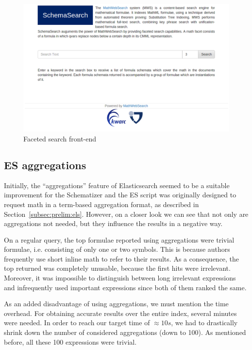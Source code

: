 \documentclass[a4paper,oneside]{article}
\begin{document}
\begin{figure}[ht]\centering
    \includegraphics[width=12.8cm]{img/frontend.png}
    \caption{Faceted search front-end}\label{fig:frontend}
\end{figure}
\FloatBarrier

\subsection{ES aggregations}\label{subsec:esagg}
Initially, the ``aggregations'' feature of Elasticsearch seemed to be a
suitable improvement for the Schematizer and the ES script was originally
designed to request math in a term-based aggregation format, as described in
Section~\ref{subsec:prelim:els}. However, on a closer look we can see that not
only are aggregations not needed, but they influence the results in a negative
way.

On a regular query, the top formulae reported using aggregations were trivial
formulae, i.e. consisting of only one or two symbols. This is because authors
frequently use short inline math to refer to their results. As a consequence,
the top returned was completely unusable, because the first hits were
irrelevant. Moreover, it was impossible to distinguish between long irrelevant
expressions and infrequently used important expressions since both of them
ranked the same.

As an added disadvantage of using aggregations, we must mention the time
overhead. For obtaining accurate results over the entire index, several
minutes were needed. In order to reach our target time of $\approx 10s$, we had to
drastically shrink down the number of considered aggregations (down to 100).
As mentioned before, all these 100 expressions were trivial.
\end{document}
